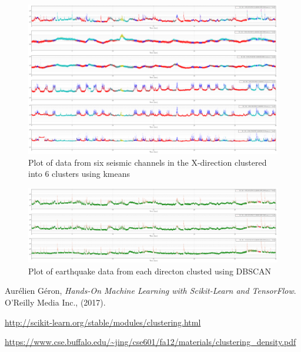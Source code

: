 \documentclass[colorlinks=true,pdfstartview=FitV,linkcolor=blue,
            citecolor=red,urlcolor=magenta]{ligodoc}
\begin{document}
\begin{figure}[htbp]
\begin{center}
\includegraphics[width=1.3\textwidth,angle=90]{all_X_6_data_data.png}
\caption{Plot of data from six seismic channels in the X-direction clustered into 6 clusters using kmeans}
\label{fig:image1}
\end{center}
\end{figure}

\begin{figure}[htbp]
\begin{center}
\includegraphics[width=1.3\textwidth,angle=90]{dbscan_EQ_XYZ_data_data.png}
\caption{Plot of earthquake data from each directon clusted using DBSCAN}
\label{fig:image2}
\end{center}
\end{figure}

\begin{thebibliography}{9}
      
	  Aurélien Géron,
	  \emph{Hands-On Machine Learning with Scikit-Learn and TensorFlow}.
	 O'Reilly Media Inc., (2017).    
      
         \url{http://scikit-learn.org/stable/modules/clustering.html}

         \url{https://www.cse.buffalo.edu/~jing/cse601/fa12/materials/clustering_density.pdf}
 
\end{thebibliography}
\end{document}
